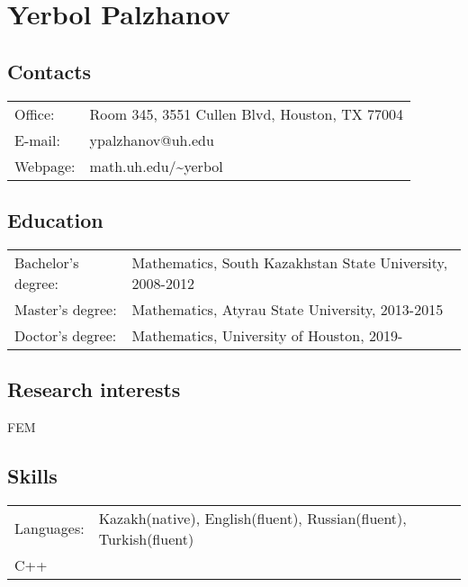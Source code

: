 \documentclass[10pt,a4paper]{article}
\begin{document}
	\section*{Yerbol Palzhanov}
		\subsection*{Contacts}
			\begin{tabular}{p{}p{}}
				Office: 					& Room 345, 3551 Cullen Blvd, Houston, TX 77004\\
				E-mail: 					& ypalzhanov@uh.edu \\
				Webpage: 				& math.uh.edu/\textasciitilde yerbol   \\
			\end{tabular}
		
		
		\subsection*{Education}
			\begin{tabular}{p{}p{}}
				Bachelor's degree: 					& Mathematics, South Kazakhstan State University, 2008-2012\\
				Master's degree: 					& Mathematics, Atyrau State University, 2013-2015\\
				Doctor's degree: 					& Mathematics, University of Houston, 2019-\\
			\end{tabular}
		
		\subsection*{Research interests}
			FEM
		
		\subsection*{Skills}
			\begin{tabular}{p{}p{}}
				Languages: 							& Kazakh(native), English(fluent), Russian(fluent), Turkish(fluent)\\
				C++											& \\
			\end{tabular}
\end{document}
